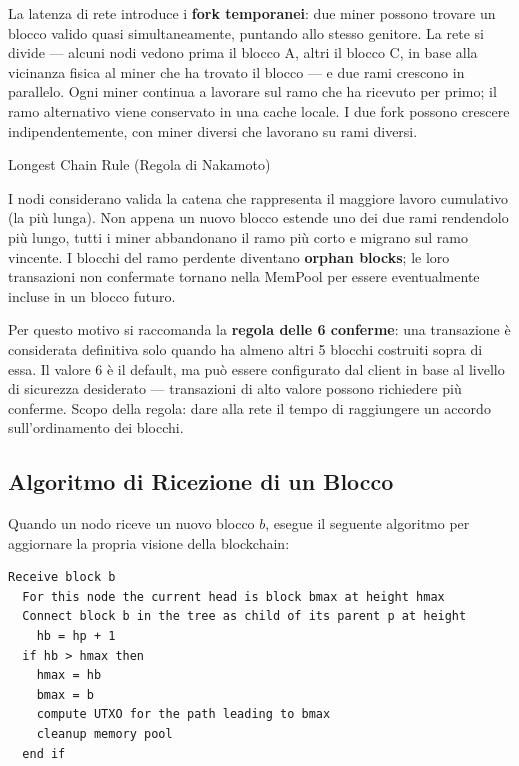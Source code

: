 \documentclass[
  italian,
  openany]{book}
\begin{document}
La latenza di rete introduce i \textbf{fork temporanei}: due miner
possono trovare un blocco valido quasi simultaneamente, puntando allo
stesso genitore. La rete si divide --- alcuni nodi vedono prima il
blocco A, altri il blocco C, in base alla vicinanza fisica al miner che
ha trovato il blocco --- e due rami crescono in parallelo. Ogni miner
continua a lavorare sul ramo che ha ricevuto per primo; il ramo
alternativo viene conservato in una cache locale. I due fork possono
crescere indipendentemente, con miner diversi che lavorano su rami
diversi.

\begin{calloutdefinition}{Longest Chain Rule (Regola di Nakamoto)}

I nodi considerano valida la catena che rappresenta il maggiore lavoro
cumulativo (la più lunga). Non appena un nuovo blocco estende uno dei
due rami rendendolo più lungo, tutti i miner abbandonano il ramo più
corto e migrano sul ramo vincente. I blocchi del ramo perdente diventano
\textbf{orphan blocks}; le loro transazioni non confermate tornano nella
MemPool per essere eventualmente incluse in un blocco futuro.

\end{calloutdefinition}

Per questo motivo si raccomanda la \textbf{regola delle 6 conferme}: una
transazione è considerata definitiva solo quando ha almeno altri 5
blocchi costruiti sopra di essa. Il valore 6 è il default, ma può essere
configurato dal client in base al livello di sicurezza desiderato ---
transazioni di alto valore possono richiedere più conferme. Scopo della
regola: dare alla rete il tempo di raggiungere un accordo
sull'ordinamento dei blocchi.

\subsection{Algoritmo di Ricezione di un
Blocco}\label{algoritmo-di-ricezione-di-un-blocco}

Quando un nodo riceve un nuovo blocco \(b\), esegue il seguente
algoritmo per aggiornare la propria visione della blockchain:

\begin{verbatim}
Receive block b
  For this node the current head is block bmax at height hmax
  Connect block b in the tree as child of its parent p at height
    hb = hp + 1
  if hb > hmax then
    hmax = hb
    bmax = b
    compute UTXO for the path leading to bmax
    cleanup memory pool
  end if
\end{verbatim}
\end{document}
